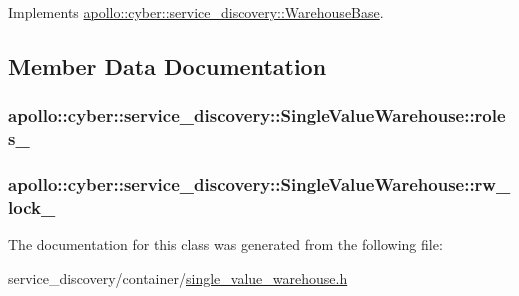 Implements \hyperlink{classapollo_1_1cyber_1_1service__discovery_1_1WarehouseBase_ac7af8481d1770471effacbf7b7dd0b64}{apollo\-::cyber\-::service\-\_\-discovery\-::\-Warehouse\-Base}.



\subsection{Member Data Documentation}
\hypertarget{classapollo_1_1cyber_1_1service__discovery_1_1SingleValueWarehouse_a4d77e4cd0c9a64f08f73ae2087cf8475}{
\subsubsection[{roles\-\_\-}]{ apollo\-::cyber\-::service\-\_\-discovery\-::\-Single\-Value\-Warehouse\-::roles\-\_\-\hspace{0.3cm}{\ttfamily [private]}}}\label{classapollo_1_1cyber_1_1service__discovery_1_1SingleValueWarehouse_a4d77e4cd0c9a64f08f73ae2087cf8475}
\hypertarget{classapollo_1_1cyber_1_1service__discovery_1_1SingleValueWarehouse_a4c99437ca1c59fcc5b3448c2c909e73a}{
\subsubsection[{rw\-\_\-lock\-\_\-}]{ apollo\-::cyber\-::service\-\_\-discovery\-::\-Single\-Value\-Warehouse\-::rw\-\_\-lock\-\_\-\hspace{0.3cm}{\ttfamily [private]}}}\label{classapollo_1_1cyber_1_1service__discovery_1_1SingleValueWarehouse_a4c99437ca1c59fcc5b3448c2c909e73a}


The documentation for this class was generated from the following file\-:\begin{DoxyCompactItemize}
\item 
service\-\_\-discovery/container/\hyperlink{single__value__warehouse_8h}{single\-\_\-value\-\_\-warehouse.\-h}\end{DoxyCompactItemize}
